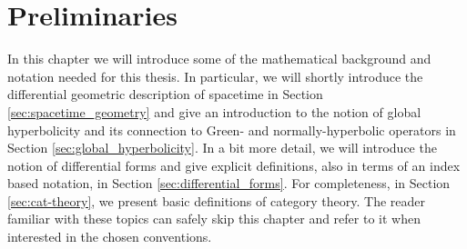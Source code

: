 \section{Preliminaries}\label{chpt:preliminiaries}
In this chapter we will introduce some of the mathematical background and notation needed for this thesis. In particular, we will shortly introduce the differential geometric description of spacetime in Section \ref{sec:spacetime_geometry} and give an introduction to the notion of global hyperbolicity and its connection to Green- and normally-hyperbolic operators in Section \ref{sec:global_hyperbolicity}. In a bit more detail, we will introduce the notion of differential forms and give explicit definitions, also in terms of an index based notation, in Section \ref{sec:differential_forms}. For completeness, in Section \ref{sec:cat-theory}, we present basic definitions of category theory. The reader familiar with these topics can safely skip this chapter and refer to it when interested in the chosen conventions.
%
%
%
%
%
%
%
